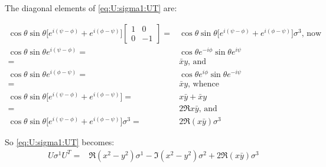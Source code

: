 \documentclass[]{article}
\begin{document}
The diagonal elements of \eqref{eq:U:sigma1:UT} are:

\begin{align*}
	 \cos\theta \sin\theta\big[e^{i(\psi-\phi)}+e^{i(\phi-\psi)}\big]\begin{bmatrix}
		1&0\\
		0&-1
	\end{bmatrix}
	=& \cos\theta \sin\theta\big[e^{i(\psi-\phi)}+e^{i(\phi-\psi)}\big] \sigma^3 \text{, now}\\
	\cos\theta \sin\theta e^{i(\psi-\phi)}=& \cos\theta e^{-i\phi} \sin\theta e^{i\psi}\\
	=& \bar{x} y \text{, and}\\
	\cos\theta \sin\theta e^{i(\phi-\psi)}=& \cos\theta e^{i\phi} \sin\theta e^{-i\psi}\\
	=& \bar{x} y \text{, whence} \\
	\cos\theta \sin\theta\big[e^{i(\psi-\phi)}+e^{i(\phi-\psi)}\big] =& x\bar{y} + \bar{x}y\\
	=&2 \Re{x\bar{y}} \text{, and}\\
	\cos\theta \sin\theta\big[e^{i(\psi-\phi)}+e^{i(\phi-\psi)}\big] \sigma^3 =& 2 \Re({x\bar{y}}) \sigma^3 
\end{align*}

So \eqref{eq:U:sigma1:UT} becomes:
\begin{align*}
		U \sigma^1 U^T  =& \Re{(x^2-y^2)} \sigma^1 - \Im{(x^2-y^2)} \sigma^2 + 2 \Re({x\bar{y}}) \sigma^3 
\end{align*}
\end{document}
